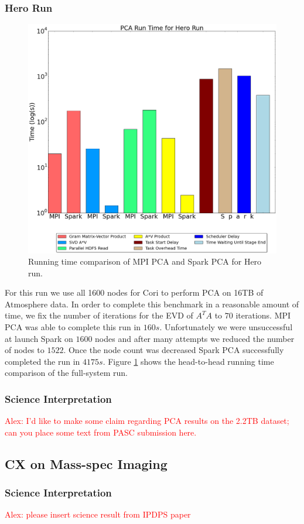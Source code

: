 \subsubsection{Hero Run}
\begin{figure}[th]
\includegraphics[width=.5\textwidth]{fig/hero_run_summary.png}
\caption{Running time comparison of MPI PCA and Spark PCA for Hero run.}
\label{fig:hero}
\end{figure}
For this run we use all 1600 nodes for Cori to perform PCA on 16TB of Atmosphere data. In order to complete this benchmark in a reasonable amount of time, we fix  the number of iterations for the EVD of $A^TA$ to $70$ iterations. MPI PCA was able to complete this run in $160s$. Unfortunately we were unsuccessful at launch Spark on $1600$ nodes and after many attempts we reduced the number of nodes to $1522$. Once the node count was decreased Spark PCA successfully completed the run in $4175s$. Figure \ref{fig:hero} shows the head-to-head running time comparison of the full-system run.   

\subsubsection{Science Interpretation}
\textcolor{red}{Alex: I'd like to make some claim regarding PCA results on the 2.2TB dataset; can you place some text from PASC submission here.}

\subsection{CX on Mass-spec Imaging}

\subsubsection{Science Interpretation}
\textcolor{red}{Alex: please insert science result from IPDPS paper}

